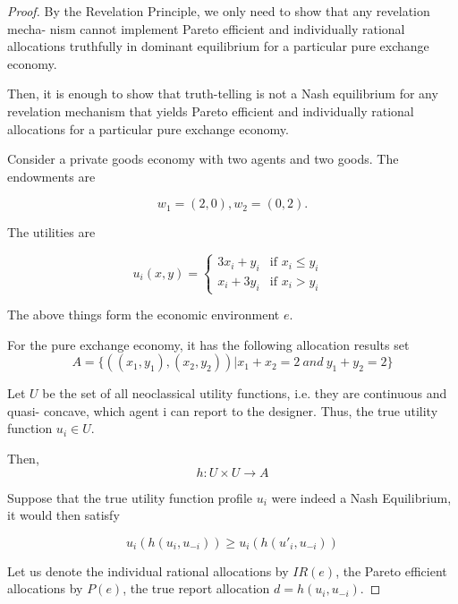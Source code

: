 \begin{proof}

By the Revelation Principle, we only need to show that any revelation mecha-
nism cannot implement Pareto efficient and individually rational allocations truthfully
in dominant equilibrium for a particular pure exchange economy.

Then, it is enough
to show that truth-telling is not a Nash equilibrium for any revelation mechanism that
yields Pareto efficient and individually rational allocations for a particular pure exchange
economy.

Consider a private goods economy with two agents and  two goods. The
endowments are 

$$w_1=(2,0), w_2=(0,2).$$

The utilities are

$$ u_i(x,y) = \begin{cases}
3x_i + y_i & \text{if $x_i\leq y_i$ } \\
x_i + 3y_i & \text{if $x_i>y_i$ }
\end{cases}$$

The above things form the economic environment $e$.

For the pure exchange economy, it has the following
allocation results set 
$$ A =\{( (x_1,y_1), (x_2,y_2))| x_1+x_2 = 2 \ and\ y_1+y_2=2 \}$$

Let $U$ be the set of all neoclassical utility functions, i.e. they are continuous and quasi-
concave, which agent i can report to the designer. Thus, the true utility function
$u_i \in U$.

Then, 
$$ h: U\times U \rightarrow A $$

Suppose that  the true utility function profile
$u_i$ were indeed a Nash Equilibrium, it would then  satisfy

\[ u_i(h(u_i, u_{-i})) \geq u_i(h(u'_i,u_{-i}))\]


Let us denote the individual rational allocations by $IR(e)$, the
Pareto efficient allocations by $P(e)$, the true report allocation
$d=h(u_i, u_{-i})$.


\end{proof}
